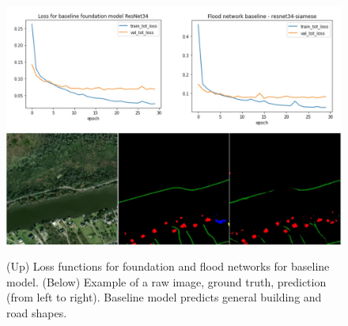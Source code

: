 \documentclass[10pt,twocolumn,letterpaper]{article}
\begin{document}
\begin{figure}[t]
  \centering
   \includegraphics[width=1\linewidth]{figures/loss.jpg}
   \includegraphics[width=1\linewidth]{figures/baseline_predictions1.jpg}
   \caption{(Up) Loss functions for foundation and flood networks for baseline model. (Below) Example of a raw image, ground truth, prediction (from left to right). Baseline model predicts general building and road shapes.}
   \label{fig:predictions}
\end{figure}
{\small


}
\end{document}
